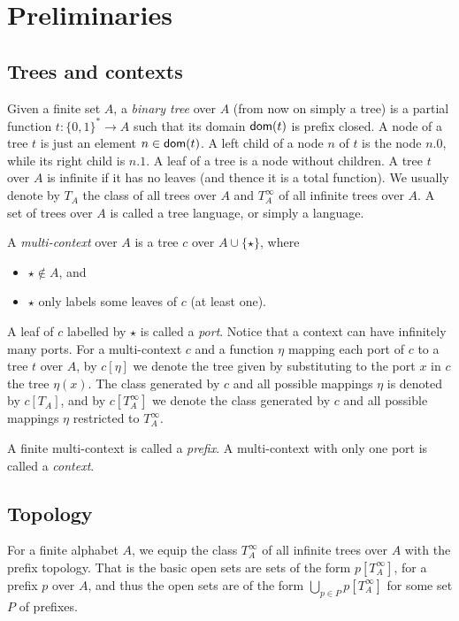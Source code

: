 \section{Preliminaries}
\subsection{Trees and contexts}
Given a finite set $A$, a \emph{binary tree} over $A$ (from now on simply a tree) is a partial function $t: \{0,1\}^* \to A$ such that its domain $\mathsf{dom}(t)$ is prefix closed. A node of a tree $t$ is just an element $n \in \mathsf{dom}(t)$. A left child of a node $n$ of $t$ is the node $n.0$, while its right child is $n.1$. A leaf of a tree is a node without children. A tree $t$ over $A$ is infinite if it has no leaves (and thence it is a total function). We usually denote by $T_A$ the class of all  trees over $A$ and $T^\infty_A$ of all infinite trees over $A$. A set of trees over $A$ is called a tree language, or simply a language.

A \emph{multi-context} over $A$ is a tree $c$ over $A \cup \{\star\}$, where 
\begin{itemize} 
\item $\star \notin A$, and 
\item $\star$ only labels some leaves of $c$ (at least one). 
\end{itemize}
A leaf of $c$ labelled by $\star$ is called a \emph{port}. Notice that a context can have infinitely many ports. For a multi-context $c$ and a function $\eta$ mapping each port of $c$ to a tree $t$ over $A$, by $c[\eta]$ we denote the tree given by substituting to the port $x$ in $c$ the tree $\eta(x)$. The class generated by $c$ and all possible mappings $\eta$ is denoted by $c[T_A]$, and by $c[T^\infty_A]$ we denote the class generated by $c$ and all possible mappings $\eta$ restricted to $T_A^\infty$. 

A finite multi-context is called a \emph{prefix}.
A multi-context with only one port is called a \emph{context}. %

\subsection{Topology}
For a finite alphabet $A$, we equip the class $T^\infty_A$ of all infinite trees over $A$ with the prefix topology. That is the basic open sets are sets of the form $p[T^\infty_A]$, for a prefix $p$ over $A$, and thus the open sets are of the form $\bigcup_{p \in P}p[T^\infty_A]$ for some set $P$ of prefixes. 

